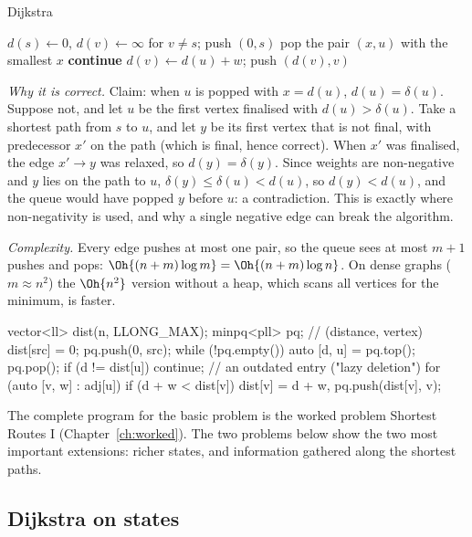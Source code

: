 \begin{pseudo}{Dijkstra}
\begin{algorithmic}[1]
\State $d(s) \gets 0$, $d(v) \gets \infty$ for $v \ne s$; push $(0, s)$
  \State pop the pair $(x, u)$ with the smallest $x$
   \textbf{continue} 
  \EndIf
     \State $d(v) \gets d(u) + w$; push $(d(v), v)$ \EndIf
  \EndFor
\EndWhile
\end{algorithmic}
\end{pseudo}

\emph{Why it is correct.} Claim: when $u$ is popped with $x = d(u)$, $d(u) = \delta(u)$. Suppose not, and let $u$ be the first
vertex finalised with $d(u) > \delta(u)$. Take a shortest path from $s$ to $u$, and let $y$ be its first vertex that is not
final, with predecessor $x'$ on the path (which is final, hence correct). When $x'$ was finalised, the edge $x' \to y$ was
relaxed, so $d(y) = \delta(y)$. Since weights are non-negative and $y$ lies on the path to $u$, $\delta(y) \le \delta(u) <
d(u)$, so $d(y) < d(u)$, and the queue would have popped $y$ before $u$: a contradiction. This is exactly where
non-negativity is used, and why a single negative edge can break the algorithm.

\emph{Complexity.} Every edge pushes at most one pair, so the queue sees at most $m + 1$ pushes and pops: $\Oh{(n + m)\log m}
= \Oh{(n + m) \log n}$. On dense graphs ($m \approx n^2$) the $\Oh{n^2}$ version without a heap, which scans all vertices for
the minimum, is faster.

\begin{code}
vector<ll> dist(n, LLONG_MAX);
minpq<pll> pq;  // (distance, vertex)
dist[src] = 0;
pq.push({0, src});
while (!pq.empty()) {
    auto [d, u] = pq.top();
    pq.pop();
    if (d != dist[u]) continue;  // an outdated entry ("lazy deletion")
    for (auto [v, w] : adj[u])
        if (d + w < dist[v]) dist[v] = d + w, pq.push({dist[v], v});
}
\end{code}


The complete program for the basic problem is the worked problem Shortest Routes I (Chapter~\ref{ch:worked}). The two problems
below show the two most important extensions: richer states, and information gathered along the shortest paths.

\subsection{Dijkstra on states}

